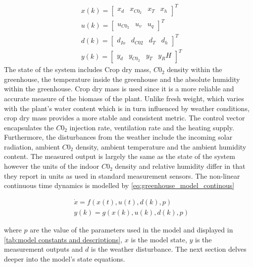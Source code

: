\begin{equation}
	\begin{aligned}
		& x(k) = \begin{bmatrix}
			x_d & x_{C0_2} & x_T & x_h
		\end{bmatrix}^T
		\\
		& u(k) = \begin{bmatrix}
			u_{C0_2} & u_{v} & u_q
		\end{bmatrix}^T
		\\
		& d(k) = \begin{bmatrix}
			d_{Io} & d_{C02} & d_T& d_h
		\end{bmatrix}^T
		\\
		& y(k) = \begin{bmatrix}
			y_d & y_{C0_2} & y_T & y_RH
		\end{bmatrix}^T
	\end{aligned}
	\label{eq: model vectors}
\end{equation}
The state of the system includes Crop dry mass, $C0_2$ density within the greenhouse, the temperature inside the greenhouse and the absolute humidity within the greenhouse. Crop dry mass is used since it is a more reliable and accurate measure of the biomass of the plant. Unlike fresh weight, which varies with the plant's water content which is in turn influenced by weather conditions, crop dry mass provides a more stable and consistent metric. The control vector encapsulates the $C0_2$ injection rate, ventilation rate and the heating supply. Furthermore, the disturbances from the weather include the incoming solar radiation, ambient $C0_2$ density, ambient temperature and the ambient humidity content. The measured output is largely the same as the state of the system however the units of the indoor $C0_2$ density and relative humidity differ in that they report in units as used in standard measurement sensors. The non-linear continuous time dynamics is modelled by \autoref{eq:greenhouse_model_continous}

\begin{equation}\label{eq:greenhouse_model_continous}
	\begin{aligned}
		& \dot{x}= f(x(t),u(t),d(k),p) \\
		& y(k) = g(x(k),u(k),d(k),p)
	\end{aligned}
\end{equation}

where $p$ are the value of the parameters used in the model and displayed in \autoref{tab:model constants and descriptions}, $x$ is the model state, $y$ is the measurement outputs and $d$ is the weather disturbance. The next section delves deeper into the model's state equations.

